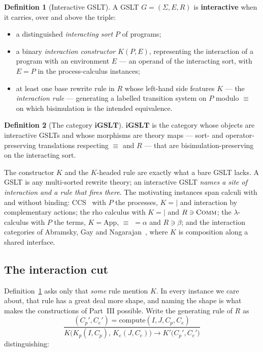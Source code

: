 \documentclass[11pt]{article}
\theoremstyle{definition}
\newtheorem{definition}{Definition}[section]
\theoremstyle{plain}
\theoremstyle{remark}
\newcommand{\iGSLT}{\mathbf{iGSLT}}
\newcommand{\compute}{\mathrm{compute}}
\begin{document}
\begin{definition}[Interactive GSLT]
\label{def:igslt}
A GSLT $G = (\Sigma,E,R)$ is \textbf{interactive} when it carries, over and above the
triple:
\begin{itemize}[leftmargin=2em]
  \item a distinguished \emph{interacting sort} $P$ of programs;
  \item a binary \emph{interaction constructor} $K(P,E)$, representing the interaction
    of a program with an environment $E$ --- an operand of the interacting sort, with
    $E = P$ in the process-calculus instances;
  \item at least one base rewrite rule in $R$ whose left-hand side features $K$ --- the
    \emph{interaction rule} --- generating a labelled transition system on $P$ modulo
    $\equiv$ on which bisimulation is the intended equivalence.
\end{itemize}
\end{definition}

\begin{definition}[The category $\iGSLT$]
$\iGSLT$ is the category whose objects are interactive GSLTs and whose morphisms are
theory maps --- sort- and operator-preserving translations respecting $\equiv$ and $R$
--- that are bisimulation-preserving on the interacting sort.
\end{definition}

The constructor $K$ and the $K$-headed rule are exactly what a bare GSLT lacks. A GSLT
is any multi-sorted rewrite theory; an interactive GSLT \emph{names a site of
interaction and a rule that fires there}. The motivating instances span calculi with and
without binding: CCS~\cite{Milner1989} with $P$ the processes, $K = {\mid}$ and
interaction by complementary actions; the rho calculus with $K = {\mid}$ and $R \ni
\textsc{Comm}$; the $\lambda$-calculus with $P$ the terms, $K = \mathrm{App}$, $\equiv$
$= \alpha$ and $R \ni \beta$; and the interaction categories of Abramsky, Gay and
Nagarajan~\cite{AbramskyGayNagarajan1996}, where $K$ is composition along a shared
interface.

\subsection{The interaction cut}
\label{subsec:cut}

Definition~\ref{def:igslt} asks only that \emph{some} rule mention $K$. In every
instance we care about, that rule has a great deal more shape, and naming the shape is
what makes the constructions of Part~III possible. Write the generating rule of $R$ as
\[
  \frac{(C_p', C_e') = \compute(I, J, C_p, C_e)}
       {K\bigl(K_p(I, C_p),\, K_e(J, C_e)\bigr) \longrightarrow K'\bigl(C_p', C_e'\bigr)}
  \tag{$\dagger$}
\]
distinguishing:
\end{document}
